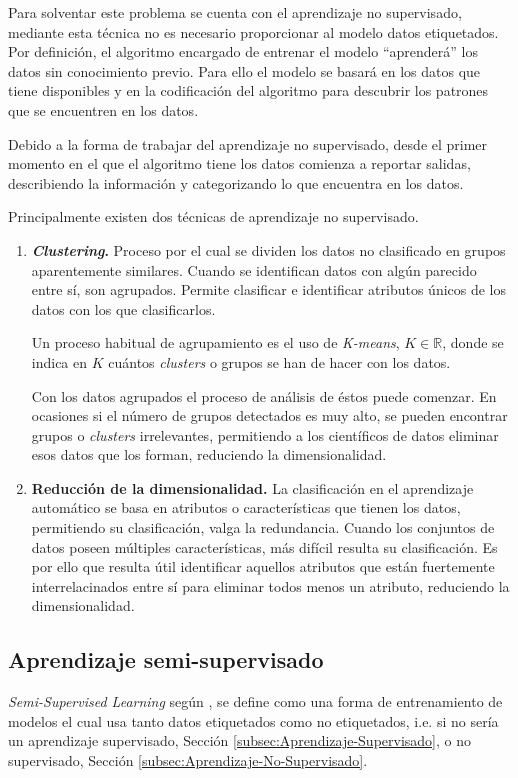 Para solventar este problema se cuenta con el aprendizaje no supervisado\cite{bengio2012unsupervised}, mediante esta técnica no es necesario proporcionar al modelo datos etiquetados. Por definición, el algoritmo encargado de entrenar el modelo  ``aprenderá'' los datos sin conocimiento previo. Para ello el modelo se basará en los datos que tiene disponibles y en la codificación del algoritmo para descubrir los patrones que se encuentren en los datos.

Debido a la forma de trabajar del aprendizaje no supervisado, desde el primer momento en el que el algoritmo tiene los datos comienza a reportar salidas, describiendo la información y categorizando lo que encuentra en los datos.

Principalmente existen dos técnicas de aprendizaje no supervisado.
\begin{enumerate}
	\item \textbf{\textit{Clustering}.}\cite{unsupervised_learning_clustering} Proceso por el cual se dividen los datos no clasificado en grupos aparentemente similares. Cuando se identifican datos con algún parecido entre sí, son agrupados. Permite clasificar e identificar atributos únicos de los datos con los que clasificarlos. 
	
	Un proceso habitual de agrupamiento es el uso de \textit{K-means}, $K\in\mathbb{R}$, donde se indica en $K$ cuántos \textit{clusters} o grupos se han de hacer con los datos. 
	
	Con los datos agrupados el proceso de análisis de éstos puede comenzar. En ocasiones si el número de grupos detectados es muy alto, se pueden encontrar grupos o \textit{clusters} irrelevantes, permitiendo a los científicos de datos eliminar esos datos que los forman, reduciendo la dimensionalidad. 
	
	\item \textbf{Reducción de la dimensionalidad.} La clasificación en el aprendizaje automático se basa en atributos o características que tienen los datos, permitiendo su clasificación, valga la redundancia. Cuando los conjuntos de datos poseen múltiples características, más difícil resulta su clasificación. Es por ello que resulta útil identificar aquellos atributos que están fuertemente interrelacinados entre sí para eliminar todos menos un atributo, reduciendo la dimensionalidad.\cite{li2002unsupervised}
\end{enumerate}

\subsection{Aprendizaje semi-supervisado}\label{subsec:Aprendizaje-Semi-Supervisado}
\textit{Semi-Supervised Learning} según \cite{zhou2014semi}, se define como una forma de entrenamiento de modelos el cual usa tanto datos etiquetados como no etiquetados, i.e. si no sería un aprendizaje supervisado, Sección \ref{subsec:Aprendizaje-Supervisado}, o no supervisado, Sección \ref{subsec:Aprendizaje-No-Supervisado}. 

